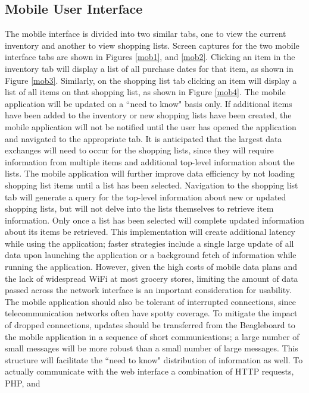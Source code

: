 \documentclass[11pt]{article} %
\begin{document}
\subsection{Mobile User Interface}
The mobile interface is divided into two similar tabs, one to view the current inventory and another to view shopping lists. Screen captures for the two mobile interface tabs are shown in Figures \ref{mob1}, and \ref{mob2}. Clicking an item in the inventory tab will display a list of all purchase dates for that item, as shown in Figure \ref{mob3}. Similarly, on the shopping list tab clicking an item will display a list of all items on that shopping list, as shown in Figure \ref{mob4}. The mobile application will be updated on a ``need to know" basis only. If additional items have been added to the inventory or new shopping lists have been created, the mobile application will not be notified until the user has opened the application and navigated to the appropriate tab. It is anticipated that the largest data exchanges will need to occur for the shopping lists, since they will require information from multiple items and additional top-level information about the lists. The mobile application will further improve data efficiency by not loading shopping list items until a list has been selected. Navigation to the shopping list tab will generate a query for the top-level information about new or updated shopping lists, but will not delve into the lists themselves to retrieve item information. Only once a list has been selected will complete updated information about its items be retrieved. This implementation will create additional latency while using the application; faster strategies include a single large update of all data upon launching the application or a background fetch of information while running the application. However, given the high costs of mobile data plans and the lack of widespread WiFi at most grocery stores, limiting the amount of data passed across the network interface is an important consideration for usability.
\newline \quad \newline
The mobile application should also be tolerant of interrupted connections, since telecommunication networks often have spotty coverage. To mitigate the impact of dropped connections, updates should be transferred from the Beagleboard to the mobile application in a sequence of short communications; a large number of small messages will be more robust than a small number of large messages. This structure will facilitate the ``need to know" distribution of information as well.
\newline \quad \newline
To actually communicate with the web interface a combination of HTTP requests, PHP, and 
\end{document}
